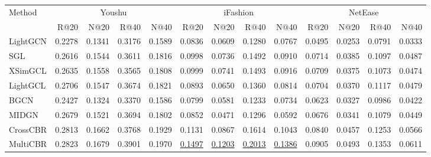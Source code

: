 \documentclass[letterpaper]{article}
\begin{document}
\begin{table}[!t]
    \centering
    {\small
    \setlength{\tabcolsep}{1mm}
    \begin{tabular}{@{}lrrrrrrrrrrrr@{}}
        \toprule
        \multirow{2}{*}{Method}
        & \multicolumn{4}{c}{Youshu}
        & \multicolumn{4}{c}{iFashion}
        & \multicolumn{4}{c}{NetEase} \\
        \cmidrule(lr){2-5}
        \cmidrule(lr){6-9}
        \cmidrule(lr){10-13}
        & R@20 & N@20 & R@40 & N@40
        & R@20 & N@20 & R@40 & N@40
        & R@20 & N@20 & R@40 & N@40 \\
        \midrule

        LightGCN
        & 0.2278 & 0.1341 & 0.3176 & 0.1589
        & 0.0836 & 0.0609 & 0.1280 & 0.0767
        & 0.0495 & 0.0253 & 0.0791 & 0.0333 \\

        SGL
        & 0.2616 & 0.1544 & 0.3611 & 0.1816
        & 0.0998 & 0.0736 & 0.1492 & 0.0910
        & 0.0714 & 0.0385 & 0.1097 & 0.0487 \\

        XSimGCL
        & 0.2635 & 0.1558 & 0.3565 & 0.1808
        & 0.0999 & 0.0741 & 0.1493 & 0.0916
        & 0.0709 & 0.0375 & 0.1073 & 0.0474 \\

        LightGCL
        & 0.2706 & 0.1547 & 0.3674 & 0.1821
        & 0.0893 & 0.0650 & 0.1360 & 0.0814
        & 0.0704 & 0.0370 & 0.1117 & 0.0479 \\
        \midrule

        BGCN
        & 0.2427 & 0.1324 & 0.3370 & 0.1586
        & 0.0799 & 0.0581 & 0.1233 & 0.0734
        & 0.0623 & 0.0327 & 0.0986 & 0.0422 \\

        MIDGN
        & 0.2679 & 0.1521 & 0.3694 & 0.1802
        & 0.0852 & 0.0471 & 0.1296 & 0.0592
        & 0.0676 & 0.0341 & 0.1079 & 0.0449 \\

        CrossCBR
        & 0.2813 & 0.1662 & 0.3768 & 0.1929
        & 0.1131 & 0.0867 & 0.1614 & 0.1043
        & 0.0840 & 0.0457 & 0.1253 & 0.0566 \\

        MultiCBR
        & 0.2823 & 0.1679 & 0.3901 & 0.1970
        & \underline{0.1497} & \underline{0.1203} & \underline{0.2013} & \underline{0.1386}
        & 0.0905 & 0.0493 & 0.1353 & 0.0611 \\


\end{tabular}}
\end{table}
\end{document}
